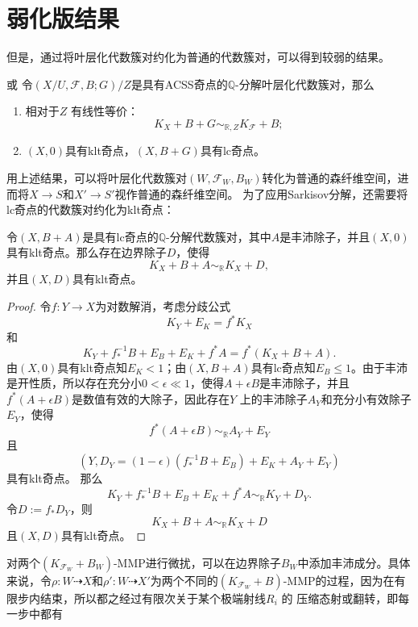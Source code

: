 \section{弱化版结果}
但是，通过将叶层化代数簇对约化为普通的代数簇对，可以得到较弱的结果。
\begin{theorem}\cite[Proposition 3.6]{acss}或\cite[Proposition 7.3.6]{chlx}  
  令$(X/U,\mathcal{F},B;G)/Z$是具有ACSS奇点的$\mathbb{Q}$-分解叶层化代数簇对，那么
  \begin{enumerate}
    \item 相对于$Z$ 有线性等价：
      \[ K_{X}+B+G\sim_{\mathbb{R},Z}K_{\mathcal{F}}+B ;\]
    \item $(X,0)$具有klt奇点，$(X,B+G)$具有lc奇点。
  \end{enumerate}
\end{theorem}
用上述结果，可以将叶层化代数簇对$(W,\mathcal{F}_{W},B_{W})$转化为普通的森纤维空间，进而将$X\to S$和$X' \to S'$视作普通的森纤维空间。
为了应用Sarkisov分解，还需要将lc奇点的代数簇对约化为klt奇点：
\begin{lemma}\label{lctoklt}
 令$(X,B+A)$是具有lc奇点的$\mathbb{Q}$-分解代数簇对，其中$A$是丰沛除子，并且$(X,0)$具有klt奇点。那么存在边界除子$D$，使得
 \[ K_{X}+B+A\sim_{\mathbb{R}}K_{X}+D ,\]
 并且$(X,D)$具有klt奇点。
\end{lemma}
\begin{proof}
  令$f:Y\to X$为对数解消，考虑分歧公式
  \[ K_{Y}+E_{K}=f^{*}K_{X} \]
  和
  \[ K_{Y}+f^{-1}_{*}B+E_{B}+E_{K}+f^{*}A=f^{*}(K_{X}+B+A) .\]
  由$(X,0)$具有klt奇点知$E_{K}< 1 $；由$(X,B+A)$具有lc奇点知$E_{B}\leqslant 1$。由于丰沛是开性质，所以存在充分小$0< \epsilon \ll 1$，使得$A+\epsilon B$是丰沛除子，并且$f^{*}(A+\epsilon B)$是数值有效的大除子，因此存在$Y$ 上的丰沛除子$A_{Y}$和充分小有效除子$E_{Y}$，使得
  \[ f^{*}(A+\epsilon B)\sim_{\mathbb{R}} A_{Y}+E_{Y} \]
  且
  \[ \left(Y,D_{Y}=(1-\epsilon)(f^{-1}_{*}B+E_{B})+E_{K}+A_{Y}+E_{Y}\right) \]
  具有klt奇点。 那么
  \[ K_{Y}+f^{-1}_{*}B+E_{B}+E_{K}+f^{*}A\sim_{\mathbb{R}} K_{Y}+D_{Y} .\]
  令$D:=f_{*}D_{Y}$，则
  \[ K_{X}+B+A\sim_{\mathbb{R}} K_{X}+D \]
  且$(X,D)$具有klt奇点。 \end{proof}
对两个$(K_{\mathcal{F}_{W}}+B_{W})$-MMP进行微扰，可以在边界除子$B_{W}$中添加丰沛成分。具体来说，令$\rho:W \dashrightarrow X$和$\rho': W \dashrightarrow X'$为两个不同的$(K_{\mathcal{F}_{W}}+B)$-MMP的过程，因为在有限步内结束，所以都之经过有限次关于某个极端射线$R_{i}$ 的 压缩态射或翻转，即每一步中都有

